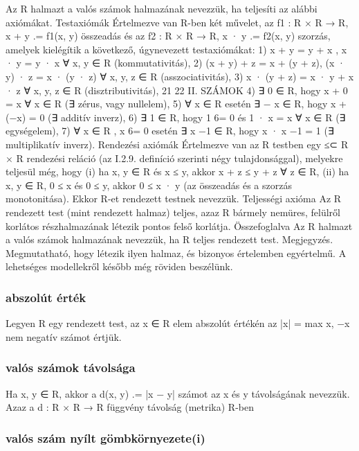 \documentclass[12pt]{article}
\begin{document}
Az R halmazt a valós számok halmazának nevezzük, ha teljesíti az
alábbi axiómákat.
Testaxiómák
Értelmezve van R-ben két művelet, az
f1 : R × R → R, x + y
.= f1(x, y) összeadás és az
f2 : R × R → R, x · y
.= f2(x, y) szorzás,
amelyek kielégítik a következő, úgynevezett testaxiómákat:
1) x + y = y + x , x · y = y · x ∀ x, y ∈ R (kommutativitás),
2) (x + y) + z = x + (y + z), (x · y) · z = x · (y · z)
∀ x, y, z ∈ R (asszociativitás),
3) x · (y + z) = x · y + x · z ∀ x, y, z ∈ R (disztributivitás),
21
22 II. SZÁMOK
4) ∃ 0 ∈ R, hogy x + 0 = x ∀ x ∈ R (∃ zérus, vagy nullelem),
5) ∀ x ∈ R esetén ∃ − x ∈ R, hogy x + (−x) = 0 (∃ additív inverz),
6) ∃ 1 ∈ R, hogy 1 6= 0 és 1 · x = x ∀ x ∈ R (∃ egységelem),
7) ∀ x ∈ R , x 6= 0 esetén ∃ x
−1 ∈ R, hogy x · x
−1 = 1 (∃ multiplikatív
inverz).
Rendezési axiómák
Értelmezve van az R testben egy ≤⊂ R × R rendezési reláció (az I.2.9.
definíció szerinti négy tulajdonsággal), melyekre teljesül még, hogy
(i) ha x, y ∈ R és x ≤ y, akkor x + z ≤ y + z ∀ z ∈ R,
(ii) ha x, y ∈ R, 0 ≤ x és 0 ≤ y, akkor 0 ≤ x · y
(az összeadás és a szorzás monotonitása). Ekkor R-et rendezett testnek
nevezzük.
Teljességi axióma
Az R rendezett test (mint rendezett halmaz) teljes, azaz R bármely nemüres,
felülről korlátos részhalmazának létezik pontos felső korlátja.
Összefoglalva
Az R halmazt a valós számok halmazának nevezzük, ha R teljes rendezett
test.
Megjegyzés. Megmutatható, hogy létezik ilyen halmaz, és bizonyos értelemben
egyértelmű. A lehetséges modellekről később még röviden beszélünk.

\subsubsection{abszolút érték}

Legyen R egy rendezett test, az x ∈ R elem abszolút értékén az
|x| = max {x, −x}
nem negatív számot értjük.

\subsubsection{valós számok távolsága}

Ha x, y ∈ R, akkor a d(x, y)
.= |x − y| számot az x és y
távolságának nevezzük.
Azaz a d : R × R → R függvény távolság (metrika) R-ben

\subsubsection{valós szám nyílt gömbkörnyezete(i)}
\end{document}
